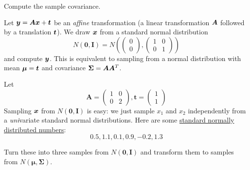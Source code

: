 \documentclass[11pt]{article}
\begin{document}
\noindent Compute the sample covariance.


\noindent Let ${\bm y} = {\bm A}{\bm x} + {\bm t}$ be an \emph{affine} transformation (a linear transformation ${\bm A}$ followed by a translation ${\bm t}$). We draw ${\bm x}$ from a standard normal distribution
\[
N(\mathbf{0}, \mathbf{I}) = N\left( \begin{pmatrix}0 \\ 0\end{pmatrix}, \begin{pmatrix}1 & 0 \\ 0 & 1\end{pmatrix} \right)
\]
and compute ${\bm y}$. This is equivalent to sampling from a normal distribution with mean $\bm{\mu} = {\bm t}$ and covariance $\bm{\Sigma} = {\bm A}{\bm A}^T $.

\qu Let 
\[
\mathbf{A} = \begin{pmatrix} 1 & 0 \\ 0 & 2\end{pmatrix}, \mathbf{t} = \begin{pmatrix} 1 \\ 1\end{pmatrix}
\]
Sampling ${\bm x}$ from $N(\bm{0}, \bm{I})$ is easy: we just sample $x_1$ and $x_2$ independently from a \emph{uni}variate standard normal distributions. Here are some \href{https://goo.gl/Jw7Hjm}{standard normally distributed numbers}:
\[
0.5, 1.1, 0.1, 0.9, -0.2, 1.3
\]

\noindent Turn these into three samples from $N(\bm{0}, \bm{I})$ and transform them to samples from $N(\bm{\mu},\bm{\Sigma})$.
\end{document}
